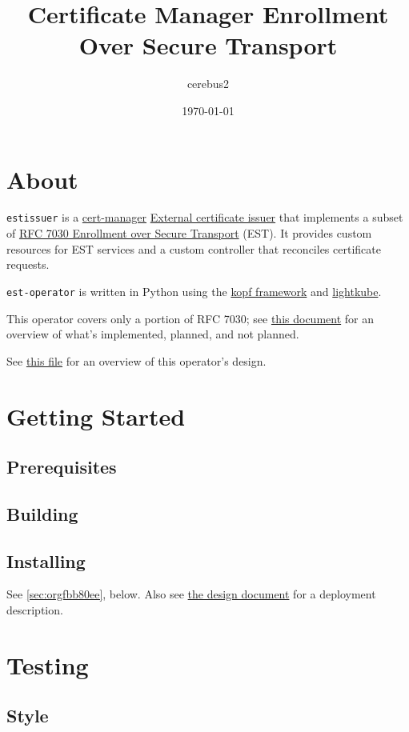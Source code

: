 \documentclass[11pt]{article}
\author{cerebus2}
\date{\today}
\title{Certificate Manager Enrollment Over Secure Transport}
\begin{document}
\maketitle
\tableofcontents

\section{About}
\label{sec:org210998c}
\texttt{estissuer} is a \href{https://cert-manager.io/}{cert-manager} \href{https://cert-manager.io/docs/configuration/external/}{External certificate issuer} that implements a subset of \href{https://tools.ietf.org/html/rfc7030}{RFC 7030 Enrollment over Secure Transport} (EST).  It provides custom resources for EST services and a custom controller that reconciles certificate requests.

\texttt{est-operator} is written in Python using the \href{https://kopf.readthedocs.io/en/stable/}{kopf framework} and \href{https://lightkube.readthedocs.io/en/latest/}{lightkube}.

This operator covers only a portion of RFC 7030; see \href{docs/RFC7030.org}{this document} for an overview of what's implemented, planned, and not planned.

See \href{docs/DESIGN.org}{this file} for an overview of this operator's design.
\section{Getting Started}
\label{sec:org1faa682}
\subsection{Prerequisites}
\label{sec:orgdf6bf16}
\subsection{Building}
\label{sec:orgfad95ca}
\subsection{Installing}
\label{sec:orgfbb7fb3}
See \ref{sec:orgfbb80ee}, below.  Also see \href{docs/DESIGN.org}{the design document} for a deployment description.
\section{Testing}
\label{sec:orgc6b7dc8}
\subsection{Style}
\label{sec:org1760767}
\end{document}

